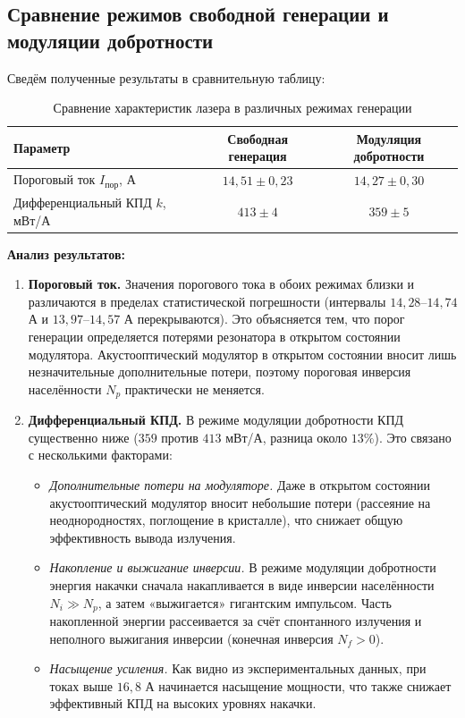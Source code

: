 \documentclass[12pt, a4paper]{article}
\begin{document}
\subsection*{Сравнение режимов свободной генерации и модуляции добротности}

Сведём полученные результаты в сравнительную таблицу:

\begin{table}[H]
    \centering
    \caption{Сравнение характеристик лазера в различных режимах генерации}
    \label{tab:comparison}
    \begin{tabular}{lcc}
        \toprule
        Параметр & Свободная генерация & Модуляция добротности \\
        \midrule
        Пороговый ток $I_{\text{пор}}$, А & $14{,}51 \pm 0{,}23$ & $14{,}27 \pm 0{,}30$ \\
        Дифференциальный КПД $k$, мВт/А & $413 \pm 4$ & $359 \pm 5$ \\
        \bottomrule
    \end{tabular}
\end{table}

\textbf{Анализ результатов:}

\begin{enumerate}
    \item \textbf{Пороговый ток.} Значения порогового тока в обоих режимах близки и различаются в пределах статистической погрешности (интервалы $14{,}28$--$14{,}74$ А и $13{,}97$--$14{,}57$ А перекрываются). Это объясняется тем, что порог генерации определяется потерями резонатора в открытом состоянии модулятора. Акустооптический модулятор в открытом состоянии вносит лишь незначительные дополнительные потери, поэтому пороговая инверсия населённости $N_p$ практически не меняется.
    
    \item \textbf{Дифференциальный КПД.} В режиме модуляции добротности КПД существенно ниже ($359$ против $413$ мВт/А, разница около $13\%$). Это связано с несколькими факторами:
    \begin{itemize}
        \item \textit{Дополнительные потери на модуляторе.} Даже в открытом состоянии акустооптический модулятор вносит небольшие потери (рассеяние на неоднородностях, поглощение в кристалле), что снижает общую эффективность вывода излучения.
        \item \textit{Накопление и выжигание инверсии.} В режиме модуляции добротности энергия накачки сначала накапливается в виде инверсии населённости $N_i \gg N_p$, а затем «выжигается» гигантским импульсом. Часть накопленной энергии рассеивается за счёт спонтанного излучения и неполного выжигания инверсии (конечная инверсия $N_f > 0$).
        \item \textit{Насыщение усиления.} Как видно из экспериментальных данных, при токах выше $16{,}8$ А начинается насыщение мощности, что также снижает эффективный КПД на высоких уровнях накачки.
    \end{itemize}
\end{enumerate}
\end{document}
